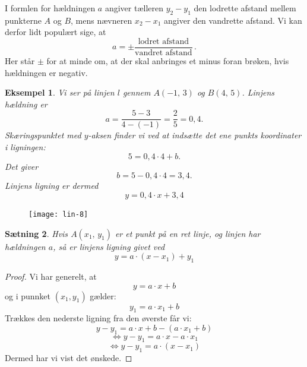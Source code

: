 \documentclass[12pt,oneside,a4paper]{article}
\newtheorem{thm}{Sætning}[section]
\newtheorem{eks}[thm]{Eksempel}
\begin{document}
I formlen for hældningen $a$ angiver tælleren $y_2-y_1$ den lodrette afstand
mellem punkterne $A$ og $B$, mens nævneren $x_2-x_1$ angiver den vandrette
afstand. Vi kan derfor lidt populært sige, at
\[
a = \pm \frac{\mbox{lodret afstand}}{\mbox{vandret afstand}} \,.
\]
Her står $\pm$ for at minde om, at der skal anbringes et minus foran brøken,
hvis hældningen er negativ.
\begin{eks}
    Vi ser på linjen $l$ gennem $A(-1,\,3)$ og $B(4,\,5)$.
    Linjens hældning er
    $$
    a = \frac{5-3}{4-(-1)} = \frac{2}{5} = 0,4.
    $$
    Skæringspunktet med $y$-aksen finder vi ved at indsætte det ene punkts
    koordinater i ligningen:
    $$
    5 = 0,4\cdot 4 + b.
    $$
    Det giver
    $$
    b = 5 - 0,4\cdot 4 = 3,4.
    $$
    Linjens ligning er dermed
    $$
    y = 0,4 \cdot x + 3,4 
    $$
\end{eks}
\begin{figure}[H]
    \centering
    \texttt{[image: lin-8]}
    \label{linear-3}
\end{figure}



\begin{thm}
    Hvis $A(x_1,\,y_1)$ er et punkt på en ret linje, og linjen har hældningen
    $a$, så er linjens ligning givet ved
    $$
    y = a\cdot (x-x_1) + y_1 
    $$
\end{thm}
\begin{proof}
    Vi har generelt, at 
    $$
    y = a\cdot x + b
    $$
    og i punnket $(x_1, y_1)$ gælder:
    $$
    y_1 = a\cdot x_1 + b
    $$
    Trækkes den nederste ligning fra den øverste får vi:
    $$
    y-y_1 = a \cdot x + b - (a \cdot x_1 + b)
    $$
    $$
    \Leftrightarrow y-y_1 = a \cdot x - a \cdot x_1
    $$
    $$
    \Leftrightarrow y-y_1 = a \cdot (x - x_1)
    $$
    Dermed har vi vist det ønskede.
\end{proof}
\end{document}
